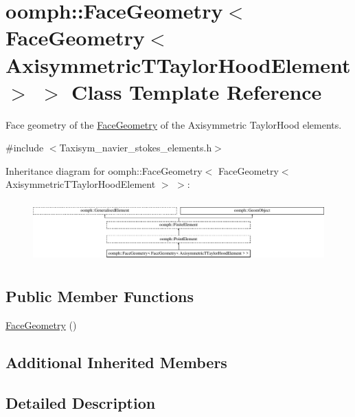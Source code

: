\hypertarget{classoomph_1_1FaceGeometry_3_01FaceGeometry_3_01AxisymmetricTTaylorHoodElement_01_4_01_4}{}\section{oomph\+:\+:Face\+Geometry$<$ Face\+Geometry$<$ Axisymmetric\+T\+Taylor\+Hood\+Element $>$ $>$ Class Template Reference}
\label{classoomph_1_1FaceGeometry_3_01FaceGeometry_3_01AxisymmetricTTaylorHoodElement_01_4_01_4}


Face geometry of the \hyperlink{classoomph_1_1FaceGeometry}{Face\+Geometry} of the Axisymmetric Taylor\+Hood elements.  




{\ttfamily \#include $<$Taxisym\+\_\+navier\+\_\+stokes\+\_\+elements.\+h$>$}

Inheritance diagram for oomph\+:\+:Face\+Geometry$<$ Face\+Geometry$<$ Axisymmetric\+T\+Taylor\+Hood\+Element $>$ $>$\+:\begin{figure}[H]
\begin{center}
\leavevmode
\includegraphics[height=2.393162cm]{classoomph_1_1FaceGeometry_3_01FaceGeometry_3_01AxisymmetricTTaylorHoodElement_01_4_01_4}
\end{center}
\end{figure}
\subsection*{Public Member Functions}
\begin{DoxyCompactItemize}
\item 
\hyperlink{classoomph_1_1FaceGeometry_3_01FaceGeometry_3_01AxisymmetricTTaylorHoodElement_01_4_01_4_ad7284ed35b1ffd92b75a1535ea947799}{Face\+Geometry} ()
\end{DoxyCompactItemize}
\subsection*{Additional Inherited Members}


\subsection{Detailed Description}
